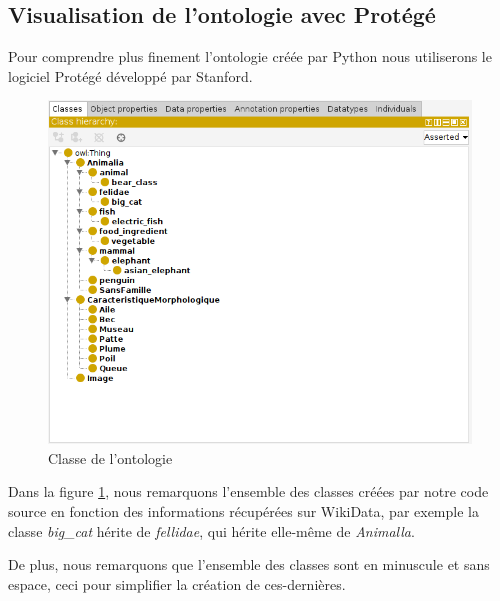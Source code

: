 \subsection{Visualisation de l'ontologie avec Protégé}

Pour comprendre plus finement l'ontologie créée par Python nous utiliserons le logiciel Protégé\cite{protege} développé par Stanford.


\begin{figure}[!h]
    \begin{center}
        \includegraphics[scale=0.35]{./ressources/Classe.png}
        \caption{Classe de l'ontologie \label{fig:classe}}
    \end{center}
\end{figure}

Dans la figure \ref{fig:classe}, nous remarquons l'ensemble des classes créées par notre code source en fonction des informations récupérées sur WikiData, par exemple la classe \textit{big\_cat} hérite de \textit{fellidae}, qui hérite elle-même de \textit{Animalla}. 

De plus, nous remarquons que l'ensemble des classes sont en minuscule et sans espace, ceci pour simplifier la création de ces-dernières.



